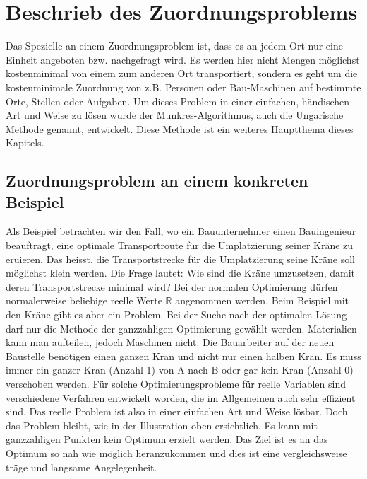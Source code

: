 %
%
%
\section{Beschrieb des Zuordnungsproblems
\label{munkres:section:teil1}}

Das Spezielle an einem Zuordnungsproblem ist, dass es an jedem Ort nur eine Einheit angeboten bzw. nachgefragt wird. Es werden hier nicht Mengen möglichst kostenminimal von einem zum anderen
Ort transportiert, sondern es geht um die kostenminimale Zuordnung von z.B. Personen oder Bau-Maschinen auf bestimmte Orte, Stellen oder Aufgaben.
Um dieses Problem in einer einfachen, händischen Art und Weise zu lösen wurde der Munkres-Algorithmus, auch die Ungarische Methode genannt, entwickelt. Diese Methode ist ein weiteres Hauptthema dieses Kapitels.

\subsection{Zuordnungsproblem an einem konkreten Beispiel
\label{munkres:subsection:bonorum}}
Als Beispiel betrachten wir den Fall, wo ein Bauunternehmer einen Bauingenieur beauftragt, eine optimale Transportroute für die Umplatzierung seiner Kräne zu eruieren. Das heisst, die Transportstrecke für die Umplatzierung seine Kräne
soll möglichst klein werden. 
Die Frage lautet: Wie sind die Kräne umzusetzen, damit deren Transportstrecke minimal wird? Bei der normalen Optimierung dürfen normalerweise beliebige reelle Werte $\mathbb{R}$ angenommen werden. 
Beim Beispiel mit den Kräne gibt es aber ein Problem. Bei der Suche nach der optimalen Lösung darf  nur die Methode der ganzzahligen Optimierung gewählt werden. Materialien kann man aufteilen, jedoch Maschinen nicht. Die Bauarbeiter auf der neuen Baustelle benötigen einen ganzen Kran und nicht nur einen halben Kran. Es muss immer ein ganzer Kran (Anzahl 1) von A nach B oder gar kein Kran (Anzahl 0) verschoben werden. 
Für solche Optimierungsprobleme für reelle Variablen sind verschiedene Verfahren entwickelt worden, die im Allgemeinen auch sehr effizient sind. Das reelle Problem ist also in einer einfachen Art und Weise lösbar. Doch das Problem bleibt, wie in der Illustration oben ersichtlich. Es kann mit ganzzahligen Punkten kein Optimum erzielt werden. Das Ziel ist es an das Optimum so nah wie möglich heranzukommen und dies ist eine vergleichsweise träge und langsame Angelegenheit.

